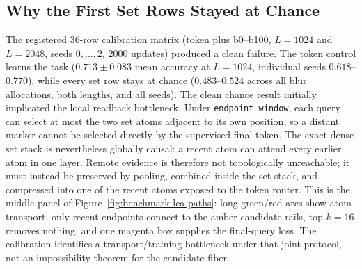 \documentclass{article}
\theoremstyle{plain}
\theoremstyle{definition}
\theoremstyle{remark}
\begin{document}
\subsection{Why the First Set Rows Stayed at Chance}
\label{sec:results-lca-calibration}

The registered 36-row calibration matrix (token plus b0--b100, $L=1024$ and
$L=2048$, seeds $0,\ldots,2$, 2000 updates) produced a clean failure.  The
token control learns the task ($0.713\pm0.083$ mean accuracy at $L=1024$,
individual seeds $0.618$--$0.770$), while every set row stays at chance
($0.483$--$0.524$ across all blur allocations, both lengths, and all seeds).
The clean chance result initially implicated the local readback bottleneck.
Under \texttt{endpoint\_window}, each query can select at most the two set
atoms adjacent to its own position, so a distant marker cannot be selected
directly by the supervised final token.  The exact-dense set stack is nevertheless
globally causal: a recent atom can attend every earlier atom in one layer.
Remote evidence is therefore not topologically unreachable; it must instead be
preserved by pooling, combined inside the set stack, and compressed into one of
the recent atoms exposed to the token router.  This is the middle panel of
Figure~\ref{fig:benchmark-lca-paths}: long green/red arcs show atom transport,
only recent endpoints connect to the amber candidate rails, top-$k=16$ removes
nothing, and one magenta box supplies the final-query loss.  The calibration identifies a
transport/training bottleneck under
that joint protocol, not an impossibility theorem for the candidate fiber.
\end{document}
